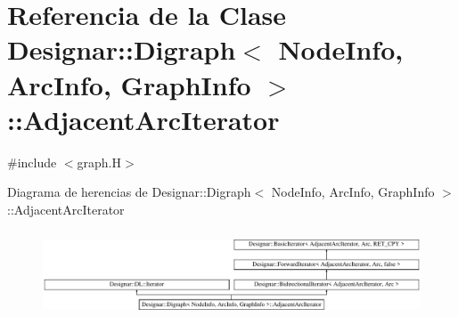 \hypertarget{class_designar_1_1_digraph_1_1_adjacent_arc_iterator}{}\section{Referencia de la Clase Designar\+:\+:Digraph$<$ Node\+Info, Arc\+Info, Graph\+Info $>$\+:\+:Adjacent\+Arc\+Iterator}
\label{class_designar_1_1_digraph_1_1_adjacent_arc_iterator}


{\ttfamily \#include $<$graph.\+H$>$}

Diagrama de herencias de Designar\+:\+:Digraph$<$ Node\+Info, Arc\+Info, Graph\+Info $>$\+:\+:Adjacent\+Arc\+Iterator\begin{figure}[H]
\begin{center}
\leavevmode
\includegraphics[height=2.604651cm]{class_designar_1_1_digraph_1_1_adjacent_arc_iterator}
\end{center}
\end{figure}
